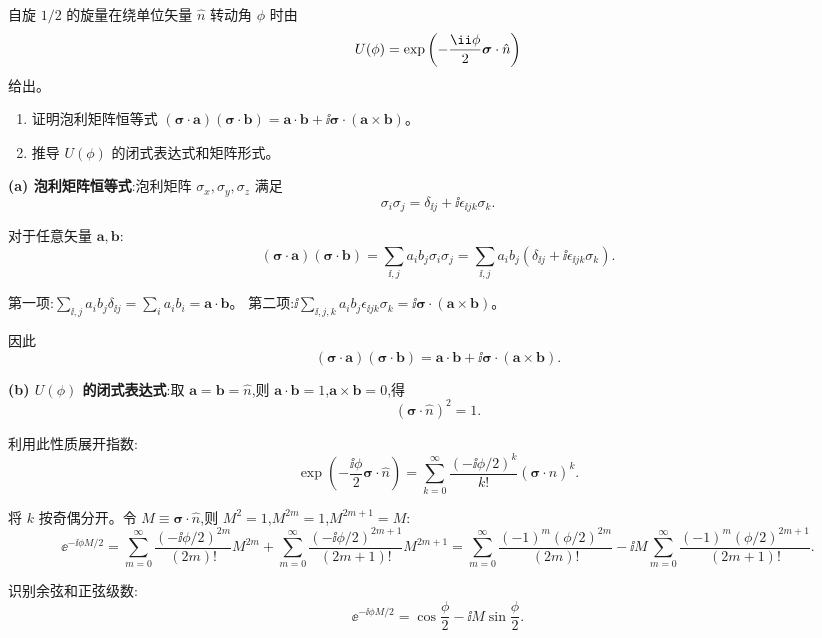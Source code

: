 \begin{question}
自旋 $1/2$ 的旋量在绕单位矢量 $\hat n$ 转动角 $\phi$ 时由
\[
U(\phi)=\exp\left(-{\ii\phi\over2}\boldsymbol\sigma\cdot\hat n\right)
\]
给出。
\begin{enumerate}
\item 证明泡利矩阵恒等式 $(\boldsymbol\sigma\cdot\mathbf a)(\boldsymbol\sigma\cdot\mathbf b)=\mathbf a\cdot\mathbf b+\ii\boldsymbol\sigma\cdot(\mathbf a\times\mathbf b)$。
\item 推导 $U(\phi)$ 的闭式表达式和矩阵形式。
\end{enumerate}
\end{question}
\begin{solution}
	\textbf{(a) 泡利矩阵恒等式}:泡利矩阵 $\sigma_x,\sigma_y,\sigma_z$ 满足
	\[
	\sigma_i\sigma_j = \delta_{\ii j} + \ii\epsilon_{\ii jk}\sigma_k.
	\]

	对于任意矢量 $\mathbf a,\mathbf b$:
	\[
	(\boldsymbol\sigma\cdot\mathbf a)(\boldsymbol\sigma\cdot\mathbf b)
	= \sum_{\ii,j} a_i b_j \sigma_i\sigma_j
	= \sum_{\ii,j} a_i b_j (\delta_{\ii j} + \ii\epsilon_{\ii jk}\sigma_k).
	\]

	第一项:$\sum_{\ii,j} a_i b_j \delta_{\ii j} = \sum_i a_i b_i = \mathbf a\cdot\mathbf b$。
	第二项:$\ii\sum_{\ii,j,k} a_i b_j \epsilon_{\ii jk}\sigma_k = \ii\boldsymbol\sigma\cdot(\mathbf a\times\mathbf b)$。

	因此
	\[
	\boxed{(\boldsymbol\sigma\cdot\mathbf a)(\boldsymbol\sigma\cdot\mathbf b)
	= \mathbf a\cdot\mathbf b + \ii\boldsymbol\sigma\cdot(\mathbf a\times\mathbf b)}.
	\]

	\textbf{(b) $U(\phi)$ 的闭式表达式}:取 $\mathbf a=\mathbf b=\hat n$,则 $\mathbf a\cdot\mathbf b=1$,$\mathbf a\times\mathbf b=0$,得
	\[
	(\boldsymbol\sigma\cdot\hat n)^2 = 1.
	\]

	利用此性质展开指数:
	\[
	\exp\!\left(-\frac{\ii\phi}{2}\boldsymbol\sigma\cdot\hat n\right)
	= \sum_{k=0}^\infty \frac{(-\ii\phi/2)^k}{k!}(\boldsymbol\sigma\cdot\hat n)^k.
	\]

	将 $k$ 按奇偶分开。令 $M \equiv \boldsymbol\sigma\cdot\hat n$,则 $M^2=1$,$M^{2m}=1$,$M^{2m+1}=M$:
	\[
	\ee^{-\ii\phi M/2}
	= \sum_{m=0}^\infty \frac{(-\ii\phi/2)^{2m}}{(2m)!} M^{2m}
	+ \sum_{m=0}^\infty \frac{(-\ii\phi/2)^{2m+1}}{(2m+1)!} M^{2m+1}
	= \sum_{m=0}^\infty \frac{(-1)^m(\phi/2)^{2m}}{(2m)!}
	- \ii M\sum_{m=0}^\infty \frac{(-1)^m(\phi/2)^{2m+1}}{(2m+1)!}.
	\]

	识别余弦和正弦级数:
	\[
	\ee^{-\ii\phi M/2} = \cos\frac{\phi}{2} - \ii M\sin\frac{\phi}{2}.
	\]


\end{solution}
